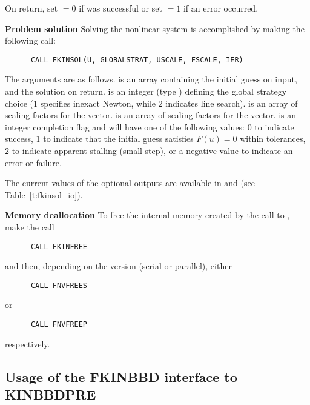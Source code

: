 \begin{Steps}
  On return, set  $= 0$ if  was successful or set  $= 1$
  if an error occurred.
  
\item {\bf Problem solution}
  Solving the nonlinear system is accomplished by making the following call:
\begin{verbatim}
      CALL FKINSOL(U, GLOBALSTRAT, USCALE, FSCALE, IER)
\end{verbatim}
  The arguments are as follows.
   is an array containing the initial guess on input, and the
  solution on return.
   is an integer (type ) defining the global strategy 
  choice ($1$ specifies inexact Newton, while $2$ indicates line search).
   is an array of scaling factors for the  vector.
   is an array of scaling factors for the  vector.
   is an integer completion flag and will have one of the following values:
  $0$ to indicate success,
  $1$ to indicate that the initial guess satisfies $F(u) = 0$ within tolerances,
  $2$ to indicate apparent stalling (small step), or
  a negative value to indicate an error or failure.
  
  The current values of the optional outputs are available in  and
   (see Table~\ref{t:fkinsol_io}).
  
\item {\bf Memory deallocation}
  To free the internal memory created by the call to ,
  make the call
\begin{verbatim}
      CALL FKINFREE
\end{verbatim}
  and then, depending on the {\nvector} version (serial or parallel), either
\begin{verbatim}
      CALL FNVFREES
\end{verbatim}
  or
\begin{verbatim}
      CALL FNVFREEP  
\end{verbatim}
  respectively.
  
\end{Steps}


\subsection{Usage of the FKINBBD interface to KINBBDPRE}

